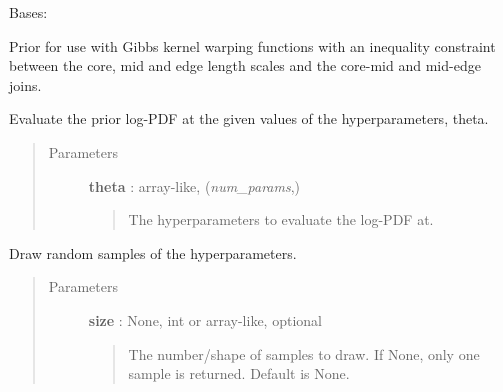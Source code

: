 \documentclass[letterpaper,10pt,english]{sphinxmanual}
\begin{document}

\begin{fulllineitems}
\label{gptools:gptools.utils.CoreMidEdgeJointPrior}
Bases: {\hyperref[gptools:gptools.utils.UniformJointPrior]{}}

Prior for use with Gibbs kernel warping functions with an inequality constraint between the core, mid and edge length scales and the core-mid and mid-edge joins.

\begin{fulllineitems}
\label{gptools:gptools.utils.CoreMidEdgeJointPrior.__call__}
Evaluate the prior log-PDF at the given values of the hyperparameters, theta.
\begin{quote}\begin{description}
\item[{Parameters}] \leavevmode
\textbf{theta} : array-like, (\emph{num\_params},)
\begin{quote}

The hyperparameters to evaluate the log-PDF at.
\end{quote}

\end{description}\end{quote}

\end{fulllineitems}


\begin{fulllineitems}
\label{gptools:gptools.utils.CoreMidEdgeJointPrior.random_draw}
Draw random samples of the hyperparameters.
\begin{quote}\begin{description}
\item[{Parameters}] \leavevmode
\textbf{size} : None, int or array-like, optional
\begin{quote}

The number/shape of samples to draw. If None, only one sample is
returned. Default is None.
\end{quote}

\end{description}\end{quote}

\end{fulllineitems}


\end{fulllineitems}
\end{document}
